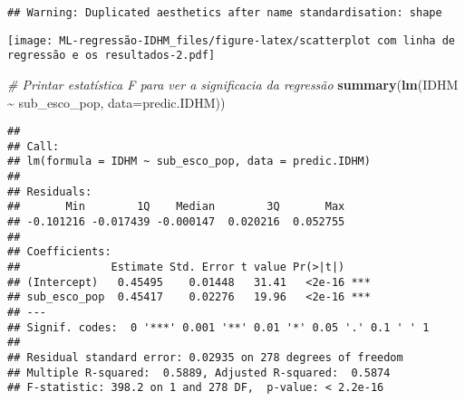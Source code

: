 \documentclass[
]{article}
\newenvironment{Shaded}{\begin{snugshade}}{\end{snugshade}}
\newcommand{\AttributeTok}[1]{\textcolor[rgb]{0.13,0.29,0.53}{#1}}
\newcommand{\CommentTok}[1]{\textcolor[rgb]{0.56,0.35,0.01}{\textit{#1}}}
\newcommand{\FunctionTok}[1]{\textcolor[rgb]{0.13,0.29,0.53}{\textbf{#1}}}
\newcommand{\NormalTok}[1]{#1}
\newcommand{\SpecialCharTok}[1]{\textcolor[rgb]{0.81,0.36,0.00}{\textbf{#1}}}
\begin{document}
\begin{verbatim}
## Warning: Duplicated aesthetics after name standardisation: shape
\end{verbatim}

\texttt{[image: ML-regressão-IDHM\_files/figure-latex/scatterplot com linha de regressão e os resultados-2.pdf]}

\begin{Shaded}
\begin{Highlighting}[]
\CommentTok{\# Printar estatística F para ver a significacia da regressão}
\FunctionTok{summary}\NormalTok{(}\FunctionTok{lm}\NormalTok{(IDHM }\SpecialCharTok{\textasciitilde{}}\NormalTok{ sub\_esco\_pop, }\AttributeTok{data=}\NormalTok{predic.IDHM))}
\end{Highlighting}
\end{Shaded}

\begin{verbatim}
## 
## Call:
## lm(formula = IDHM ~ sub_esco_pop, data = predic.IDHM)
## 
## Residuals:
##       Min        1Q    Median        3Q       Max 
## -0.101216 -0.017439 -0.000147  0.020216  0.052755 
## 
## Coefficients:
##              Estimate Std. Error t value Pr(>|t|)    
## (Intercept)   0.45495    0.01448   31.41   <2e-16 ***
## sub_esco_pop  0.45417    0.02276   19.96   <2e-16 ***
## ---
## Signif. codes:  0 '***' 0.001 '**' 0.01 '*' 0.05 '.' 0.1 ' ' 1
## 
## Residual standard error: 0.02935 on 278 degrees of freedom
## Multiple R-squared:  0.5889, Adjusted R-squared:  0.5874 
## F-statistic: 398.2 on 1 and 278 DF,  p-value: < 2.2e-16
\end{verbatim}
\end{document}
